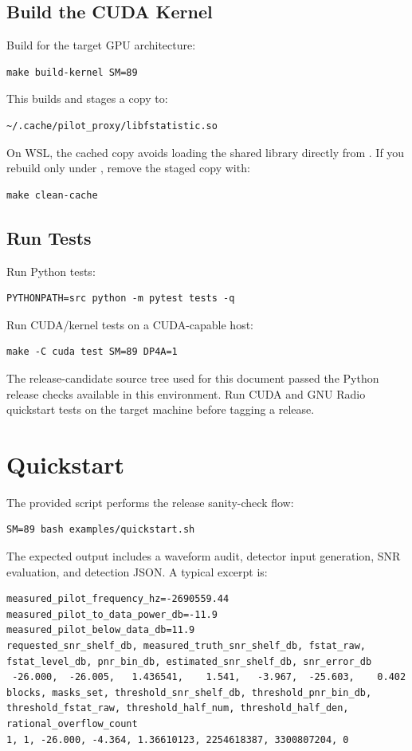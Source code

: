 \documentclass[10pt,letterpaper]{article}
\newcommand{\code}[1]{\texttt{\detokenize{#1}}}
\begin{document}
\subsection{Build the CUDA Kernel}

Build for the target GPU architecture:
\begin{lstlisting}[style=shell]
make build-kernel SM=89
\end{lstlisting}
This builds \code{cuda/libfstatistic.so} and stages a copy to:
\begin{lstlisting}[style=shell]
~/.cache/pilot_proxy/libfstatistic.so
\end{lstlisting}
On WSL, the cached copy avoids loading the shared library directly from \code{/mnt/c}.  If you rebuild only under \code{cuda/}, remove the staged copy with:
\begin{lstlisting}[style=shell]
make clean-cache
\end{lstlisting}

\subsection{Run Tests}

Run Python tests:
\begin{lstlisting}[style=shell]
PYTHONPATH=src python -m pytest tests -q
\end{lstlisting}
Run CUDA/kernel tests on a CUDA-capable host:
\begin{lstlisting}[style=shell]
make -C cuda test SM=89 DP4A=1
\end{lstlisting}
The release-candidate source tree used for this document passed the Python release checks available in this environment.  Run CUDA and GNU Radio quickstart tests on the target machine before tagging a release.

\section{Quickstart}

The provided script performs the release sanity-check flow:
\begin{lstlisting}[style=shell]
SM=89 bash examples/quickstart.sh
\end{lstlisting}
The expected output includes a waveform audit, detector input generation, SNR evaluation, and detection JSON.  A typical excerpt is:
\begin{lstlisting}[style=shell]
measured_pilot_frequency_hz=-2690559.44
measured_pilot_to_data_power_db=-11.9
measured_pilot_below_data_db=11.9
requested_snr_shelf_db, measured_truth_snr_shelf_db, fstat_raw, fstat_level_db, pnr_bin_db, estimated_snr_shelf_db, snr_error_db
 -26.000,  -26.005,   1.436541,    1.541,   -3.967,  -25.603,    0.402
blocks, masks_set, threshold_snr_shelf_db, threshold_pnr_bin_db, threshold_fstat_raw, threshold_half_num, threshold_half_den, rational_overflow_count
1, 1, -26.000, -4.364, 1.36610123, 2254618387, 3300807204, 0
\end{lstlisting}
\end{document}

